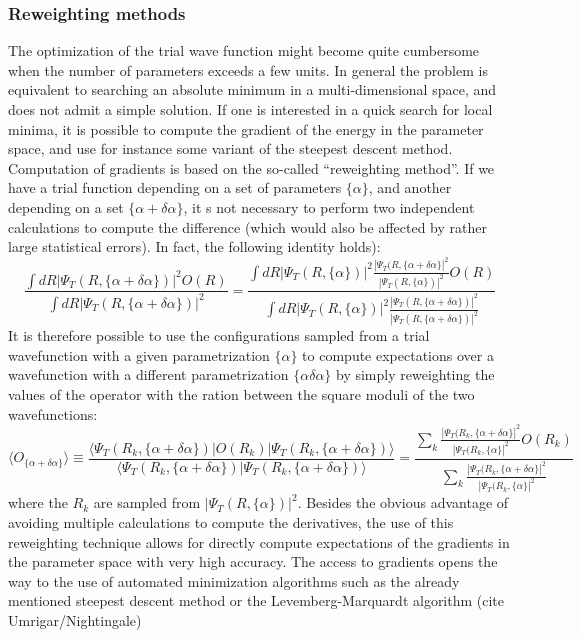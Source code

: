 \subsubsection{Reweighting methods}
The optimization of the trial wave function might become quite cumbersome when the number of parameters exceeds a few units. In general the problem is equivalent to searching an absolute minimum in a multi-dimensional space, and does not admit a simple solution.
If one is interested in a quick search for local minima, it is possible to compute the gradient of the energy in the parameter space, and use for instance some variant of the steepest descent method. Computation of gradients is based on the so-called ``reweighting method''. If we have a trial function depending on a set of parameters $\{\alpha\}$, and another depending on a set $\{\alpha+\delta\alpha\}$, it s not necessary to perform two independent calculations to compute the difference (which would also be affected by rather large statistical errors). In fact, the following identity holds):
\begin{equation}
\frac{\int dR |\Psi_T(R,\{\alpha+\delta\alpha\})|^2 O(R)}{\int dR |\Psi_T(R,\{\alpha+\delta\alpha\})|^2}=
\frac{\int dR |\Psi_T(R,\{\alpha\})|^2 \frac{|\Psi_T(R,\{\alpha+\delta\alpha\}|^2}{|\Psi_T(R,\{\alpha\})|^2}O(R)}{\int dR |\Psi_T(R,\{\alpha\})|^2\frac{|\Psi_T(R,\{\alpha+\delta\alpha\})|^2}{|\Psi_T(R,\{\alpha+\delta\alpha\})|^2}}
\end{equation}
It is therefore possible to use the configurations sampled from a trial wavefunction with a given parametrization $\{\alpha\}$ to compute expectations over a wavefunction with a different parametrization $\{\alpha\delta\alpha\}$ by simply reweighting the values of the operator with the ration between the square moduli of the two wavefunctions:
\begin{equation}
\langle O_{\{\alpha+\delta\alpha\}}\rangle\equiv
\frac{\langle \Psi_T(R_k,\{\alpha+\delta\alpha\})|O(R_k)|\Psi_T(R_k,\{\alpha+\delta\alpha\})\rangle}{\langle \Psi_T(R_k,\{\alpha+\delta\alpha\})|\Psi_T(R_k,\{\alpha+\delta\alpha\})\rangle}=
\frac{\sum_k \frac{|\Psi_T(R_k,\{\alpha+\delta\alpha\}|^2}{|\Psi_T(R_k,\{\alpha\}|^2}O(R_k)}{\sum_k \frac{|\Psi_T(R_k,\{\alpha+\delta\alpha\}|^2}{|\Psi_T(R_k,\{\alpha\}|^2}}
\end{equation}
where the $R_k$ are sampled from $|\Psi_T(R,\{\alpha\})|^2$. Besides the obvious advantage of avoiding multiple calculations to compute the derivatives, the use of this reweighting technique allows for directly compute expectations of the gradients in the parameter space with very high accuracy. The access to gradients opens the way to the use of automated minimization algorithms such as the already mentioned steepest descent method or the Levemberg-Marquardt algorithm (cite Umrigar/Nightingale)


